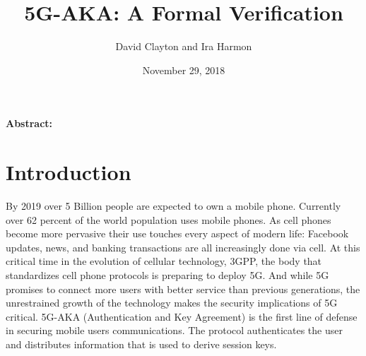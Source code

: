 \documentclass[11pt, pdftex]{article}
\title{5G-AKA: A Formal Verification}
\author{David Clayton and Ira Harmon}
\date{November 29, 2018}
\begin{document}
\maketitle
\textbf{Abstract:} 

\newpage
\section{Introduction}
By 2019 over 5 Billion people are expected to own a mobile phone.  Currently over 62 percent of the world population uses mobile phones.  As cell phones become more pervasive their use touches every aspect of modern life: Facebook updates, news, and banking transactions are all increasingly done via cell.  At this critical time in the evolution of cellular technology, 3GPP, the body that standardizes cell phone protocols is preparing to deploy 5G.  And while 5G promises to connect more users with better service than previous generations, the unrestrained growth of the technology makes the security implications of 5G critical.  5G-AKA (Authentication and Key Agreement) is the first line of defense in securing mobile users communications.  The protocol authenticates the user and distributes information that is used to derive session keys.        

\nocite{*}


\end{document}

